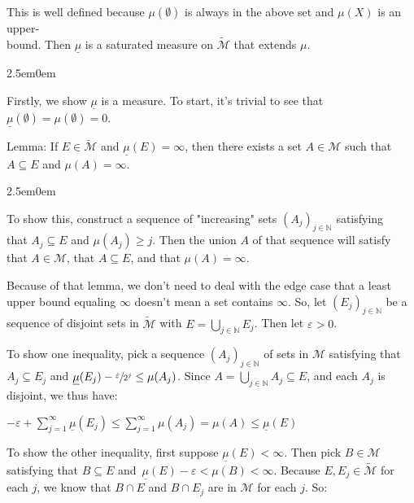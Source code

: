 \documentclass{book}
\newcommand{\exTwoP}{%
   \color{RedViolet}%
   \fontsize{13}{15}\selectfont%
}
\newcommand{\exPPP}{%
   \color{VioletRed}%
   \fontsize{12}{14}\selectfont%
}
\newenvironment{myIndent}{%
   \begin{adjustwidth}{2.5em}{0em}%
}{%
   \end{adjustwidth}%
}
\newcommand{\retTwo}{\hfill\bigbreak}
\begin{document}
\begin{enumerate}
   This is well defined because $\mu(\emptyset)$ is always in the above set and $\mu(X)$ is an upper-\\bound. Then $\underline{\mu}$ is a saturated measure on $\widetilde{\mathcal{M}}$ that extends $\mu$.\\ [-16pt]

   \begin{myIndent}\exTwoP
      Firstly, we show $\underline{\mu}$ is a measure. To start, it's trivial to see that $\underline{\mu}(\emptyset) = \mu(\emptyset) = 0$.\retTwo

      Lemma: If $E \in \widetilde{\mathcal{M}}$ and $\underline{\mu}(E) = \infty$, then there exists a set $A \in \mathcal{M}$ such that $A \subseteq E$ and $\mu(A) = \infty$. 
      \begin{myIndent}\exPPP
         To show this, construct a sequence of "increasing" sets $(A_j)_{j \in \mathbb{N}}$ satisfying\\ that $A_j \subseteq E$ and $\mu(A_j) \geq j$. Then the union $A$ of that sequence will satisfy\\ that $A \in \mathcal{M}$, that $A \subseteq E$, and that $\mu(A) = \infty$.\retTwo
      \end{myIndent}

      Because of that lemma, we don't need to deal with the edge case that a least\\ upper bound equaling $\infty$ doesn't mean a set contains $\infty$. So, let $(E_j)_{j \in \mathbb{N}}$ be a sequence of disjoint sets in $\widetilde{\mathcal{M}}$ with $E = \bigcup\limits_{j \in \mathbb{N}} E_j$. Then let $\varepsilon > 0$.\retTwo

      To show one inequality, pick a sequence $(A_j)_{j \in \mathbb{N}}$ of sets in $\mathcal{M}$ satisfying that $A_j \subseteq E_j$ and $\underline{\mu}(E_j) - \sfrac{\varepsilon}{2^j} \leq \mu(A_j)$. Since $A = \bigcup\limits_{j \in \mathbb{N}}A_j \subseteq E$, and each $A_j$ is\\ [-10pt] disjoint, we thus have:

      {\centering $-\varepsilon + \sum\limits_{j=1}^\infty \underline{\mu}(E_j) \leq \sum\limits_{j=1}^\infty \mu(A_j) = \mu(A) \leq \underline{\mu}(E)$\newpage\par}

		To show the other inequality, first suppose $\underline{\mu}(E) < \infty$. Then pick $B \in \mathcal{M}$\\ [-2pt] satisfying that $B \subseteq E$ and\ $\underline{\mu}(E) - \varepsilon < \mu(B) < \infty$. Because $E, E_j \in \widetilde{\mathcal{M}}$ for each $j$, we know that $B \cap E$ and $B \cap E_j$ are in $\mathcal{M}$ for each $j$. So:


\end{myIndent}
\end{enumerate}
\end{document}
